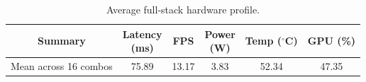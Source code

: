 \begin{table}[H]
\centering
\small
\caption{Average full-stack hardware profile.}
\label{tab:fullstack_rank02_hardware_avg}

\begin{tabular}{c c c c c c}
\toprule
\textbf{Summary} &
\makecell[c]{\textbf{Latency}\\\textbf{(ms)}} &
\textbf{FPS} &
\makecell[c]{\textbf{Power}\\\textbf{(W)}} &
\makecell[c]{\textbf{Temp}\\\textbf{($^\circ$C)}} &
\textbf{GPU (\%)} \\
\midrule
Mean across 16 combos &
75.89 &
13.17 &
3.83 &
52.34 &
47.35 \\
\bottomrule
\end{tabular}
\end{table}
